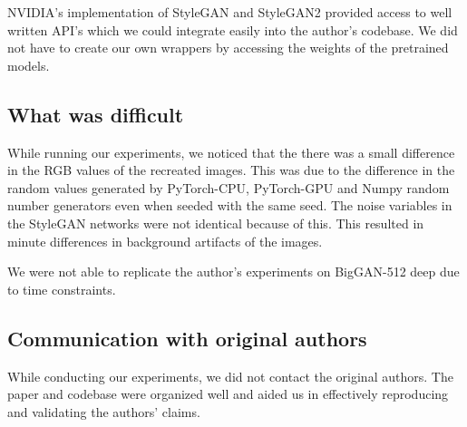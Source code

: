 \documentclass{article}
\begin{document}
NVIDIA's implementation of StyleGAN and StyleGAN2 provided access to well written API's which we could integrate easily into the author's codebase. We did not have to create our own wrappers by accessing the weights of the pretrained models.


\subsection{What was difficult}

While running our experiments, we noticed that the there was a small difference in the RGB values of the recreated images. This was due to the difference in the random values generated by PyTorch-CPU, PyTorch-GPU and Numpy random number generators even when seeded with the same seed. The noise variables in the StyleGAN networks were not identical because of this. This resulted in minute differences in background artifacts of the images.

We were not able to replicate the author's experiments on BigGAN-512 deep due to time constraints. 


\subsection{Communication with original authors}
While conducting our experiments, we did not contact the original authors. The paper and codebase were organized well and aided us in effectively reproducing and validating the authors' claims.





\end{document}
